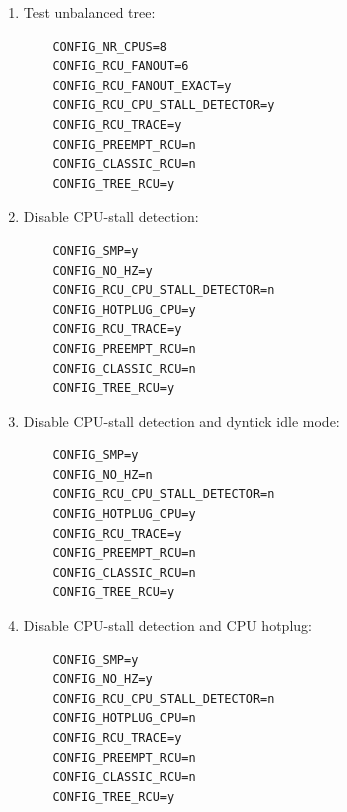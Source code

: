 \begin{enumerate}
\item	Test unbalanced tree:

\vspace{5pt}
\begin{minipage}[t]{\columnwidth}
\small
\begin{verbatim}
	CONFIG_NR_CPUS=8
	CONFIG_RCU_FANOUT=6
	CONFIG_RCU_FANOUT_EXACT=y
	CONFIG_RCU_CPU_STALL_DETECTOR=y
	CONFIG_RCU_TRACE=y
	CONFIG_PREEMPT_RCU=n
	CONFIG_CLASSIC_RCU=n
	CONFIG_TREE_RCU=y
\end{verbatim}
\end{minipage}
\vspace{5pt}

\item	Disable CPU-stall detection:

\vspace{5pt}
\begin{minipage}[t]{\columnwidth}
\small
\begin{verbatim}
	CONFIG_SMP=y
	CONFIG_NO_HZ=y
	CONFIG_RCU_CPU_STALL_DETECTOR=n
	CONFIG_HOTPLUG_CPU=y
	CONFIG_RCU_TRACE=y
	CONFIG_PREEMPT_RCU=n
	CONFIG_CLASSIC_RCU=n
	CONFIG_TREE_RCU=y
\end{verbatim}
\end{minipage}
\vspace{5pt}

\item	Disable CPU-stall detection and dyntick idle mode:

\vspace{5pt}
\begin{minipage}[t]{\columnwidth}
\small
\begin{verbatim}
	CONFIG_SMP=y
	CONFIG_NO_HZ=n
	CONFIG_RCU_CPU_STALL_DETECTOR=n
	CONFIG_HOTPLUG_CPU=y
	CONFIG_RCU_TRACE=y
	CONFIG_PREEMPT_RCU=n
	CONFIG_CLASSIC_RCU=n
	CONFIG_TREE_RCU=y
\end{verbatim}
\end{minipage}
\vspace{5pt}

\item	Disable CPU-stall detection and CPU hotplug:

\vspace{5pt}
\begin{minipage}[t]{\columnwidth}
\small
\begin{verbatim}
	CONFIG_SMP=y
	CONFIG_NO_HZ=y
	CONFIG_RCU_CPU_STALL_DETECTOR=n
	CONFIG_HOTPLUG_CPU=n
	CONFIG_RCU_TRACE=y
	CONFIG_PREEMPT_RCU=n
	CONFIG_CLASSIC_RCU=n
	CONFIG_TREE_RCU=y
\end{verbatim}
\end{minipage}
\vspace{5pt}


\end{enumerate}
